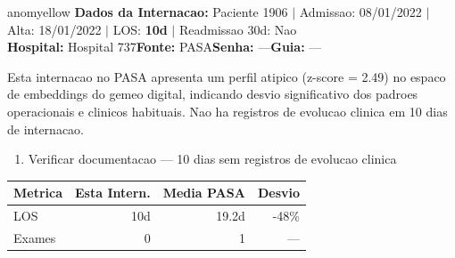 \documentclass[a4paper,10pt]{article}
\begin{document}
\begin{anomalycard}[Internacao 59253 | PASA | MODERADO (z=2.49)]{anomyellow}
\textbf{Dados da Internacao:} Paciente 1906 $\mid$ Admissao: 08/01/2022 $\mid$ Alta: 18/01/2022 $\mid$ LOS: \textbf{10d} $\mid$ Readmissao 30d: Nao\\
\textbf{Hospital:} Hospital 737\quad\textbf{Fonte:} PASA\quad\textbf{Senha:} ---\quad\textbf{Guia:} ---\\
\vspace{2pt}\begin{tcolorbox}[colback=severityred!20,colframe=anomyellow,title={\textbf{Interpretacao de Negocio}},fonttitle=\bfseries\small,left=4pt,right=4pt,top=3pt,bottom=3pt]
{\small Esta internacao no PASA apresenta um perfil atipico (z-score = 2.49) no espaco de embeddings do gemeo digital, indicando desvio significativo dos padroes operacionais e clinicos habituais. Nao ha registros de evolucao clinica em 10 dias de internacao.}
\end{tcolorbox}
\begin{tcolorbox}[colback=severityyellow!30,colframe=anomorange,title={\textbf{Recomendacoes Especificas}},fonttitle=\bfseries\small,left=4pt,right=4pt,top=3pt,bottom=3pt]
\begin{enumerate}[nosep,leftmargin=16pt]
\item {\small Verificar documentacao --- 10 dias sem registros de evolucao clinica}
\end{enumerate}
\end{tcolorbox}
\begin{center}\begin{tabular}{l r r r}\toprule\textbf{Metrica} & \textbf{Esta Intern.} & \textbf{Media PASA} & \textbf{Desvio} \\\midrule
LOS & 10d & 19.2d & -48\% \\
Exames & 0 & 1 & --- \\
\bottomrule\end{tabular}\end{center}


\end{anomalycard}
\end{document}
